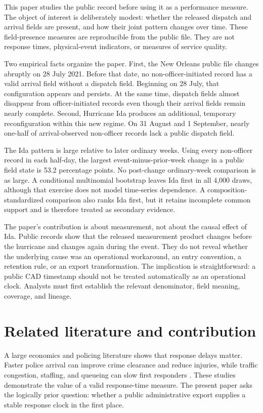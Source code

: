 \documentclass[11pt]{article}
\begin{document}
This paper studies the public record before using it as a performance measure. The object of interest is deliberately modest: whether the released dispatch and arrival fields are present, and how their joint pattern changes over time. These field-presence measures are reproducible from the public file. They are not response times, physical-event indicators, or measures of service quality.

Two empirical facts organize the paper. First, the New Orleans public file changes abruptly on 28 July 2021. Before that date, no non-officer-initiated record has a valid arrival field without a dispatch field. Beginning on 28 July, that configuration appears and persists. At the same time, dispatch fields almost disappear from officer-initiated records even though their arrival fields remain nearly complete. Second, Hurricane Ida produces an additional, temporary reconfiguration within this new regime. On 31 August and 1 September, nearly one-half of arrival-observed non-officer records lack a public dispatch field.

The Ida pattern is large relative to later ordinary weeks. Using every non-officer record in each half-day, the largest event-minus-prior-week change in a public field state is 53.2 percentage points. No post-change ordinary-week comparison is as large. A conditional multinomial bootstrap leaves Ida first in all 4,000 draws, although that exercise does not model time-series dependence. A composition-standardized comparison also ranks Ida first, but it retains incomplete common support and is therefore treated as secondary evidence.

The paper's contribution is about measurement, not about the causal effect of Ida. Public records show that the released measurement product changes before the hurricane and changes again during the event. They do not reveal whether the underlying cause was an operational workaround, an entry convention, a retention rule, or an export transformation. The implication is straightforward: a public CAD timestamp should not be treated automatically as an operational clock. Analysts must first establish the relevant denominator, field meaning, coverage, and lineage.

\section{Related literature and contribution}

A large economics and policing literature shows that response delays matter. Faster police arrival can improve crime clearance and reduce injuries, while traffic congestion, staffing, and queueing can slow first responders \citep{BlanesKirchmaier2018,DeAngeloTogerWeisburd2023,BrentBeland2020,MourtgosAdamsNix2024}. These studies demonstrate the value of a valid response-time measure. The present paper asks the logically prior question: whether a public administrative export supplies a stable response clock in the first place.
\end{document}
